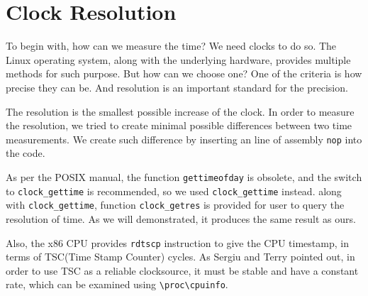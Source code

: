 \section{Clock Resolution}

To begin with, how can we measure the time? We need clocks to do so. The Linux operating system, along with the underlying hardware, provides multiple methods for such purpose. But how can we choose one? One of the criteria is how precise they can be. And resolution is an important standard for the precision.

The resolution is the smallest possible increase of the clock. In order to measure the resolution, we tried to create minimal possible differences between two time measurements. We create such difference by inserting an line of assembly \texttt{nop} into the code. 

As per the POSIX manual\cite{posix-clock-gettime}, the function \texttt{gettimeofday} is obsolete, and the switch to \texttt{clock\_gettime} is recommended, so we used \texttt{clock\_gettime} instead. along with \texttt{clock\_gettime}, function \texttt{clock\_getres} is provided for user to query the resolution of time. As we will demonstrated, it produces the same result as ours.

Also, the x86 CPU provides \texttt{rdtscp} instruction to give the CPU timestamp, in terms of TSC(Time Stamp Counter) cycles. As Sergiu and Terry pointed out, in order to use TSC as a reliable clocksource, it must be stable and have a constant rate, which can be examined using \texttt{\textbackslash{}proc\textbackslash{}cpuinfo}\cite{constant_tsc}.